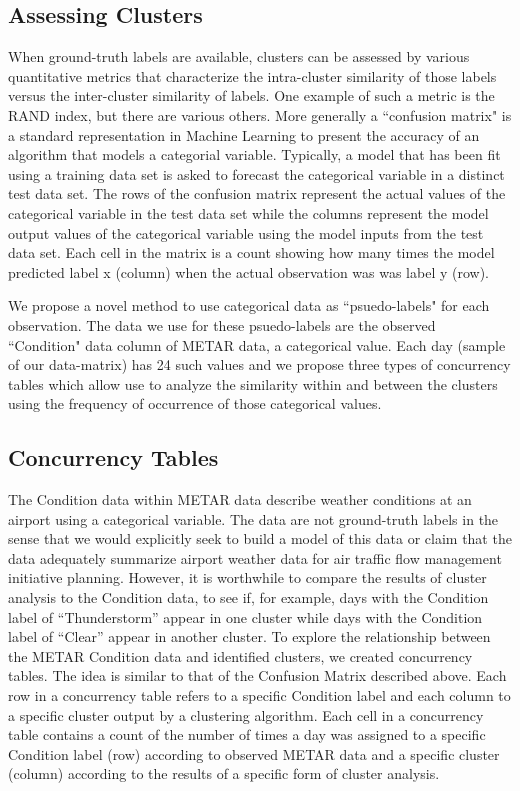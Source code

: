 \documentclass[11pt]{scrartcl}
\begin{document}
\subsection{Assessing Clusters}
When ground-truth labels are available, clusters can be assessed by various quantitative metrics that characterize the intra-cluster similarity of those labels versus the inter-cluster similarity of labels.  One example of such a metric is the RAND index, but there are various others.  More generally a ``confusion matrix" is a standard representation in Machine Learning to present the accuracy of an algorithm that models a categorial variable.  Typically, a model that has been fit using a training data set is asked to forecast the categorical variable in a distinct test data set.  The rows of the confusion matrix represent the actual values of the categorical variable in the test data set while the columns represent the model output values of the categorical variable using the model inputs from the test data set.  Each cell in the matrix is a count showing how many times the model predicted label x (column) when the actual observation was was label y (row).

We propose a novel method to use categorical data as ``psuedo-labels" for each observation.  The data we use for these psuedo-labels are the observed ``Condition" data column of METAR data, a categorical value.  Each day (sample of our data-matrix) has 24 such values and we propose three types of concurrency tables which allow use to analyze the similarity within and between the clusters using the frequency of occurrence of those categorical values.
\subsection*{Concurrency Tables}
The Condition data within METAR data describe weather conditions at an airport using a categorical variable.  The data are not ground-truth labels in the sense that we would explicitly seek to build a model of this data or claim that the data adequately summarize airport weather data for air traffic flow management initiative planning.  However, it is worthwhile to compare the results of cluster analysis to the Condition data, to see if, for example, days with the Condition label of ``Thunderstorm'' appear in one cluster while days with the Condition label of ``Clear'' appear in another cluster.  To explore the relationship between the METAR Condition data and identified clusters, we created concurrency tables.  The idea is similar to that of the Confusion Matrix described above.  Each row in a concurrency table refers to a specific Condition label and each column to a specific cluster output by a clustering algorithm.  Each cell in a concurrency table contains a count of the number of times a day was assigned to a specific Condition label (row) according to observed METAR data and a specific cluster (column) according to the results of a specific form of cluster analysis.
\end{document}
